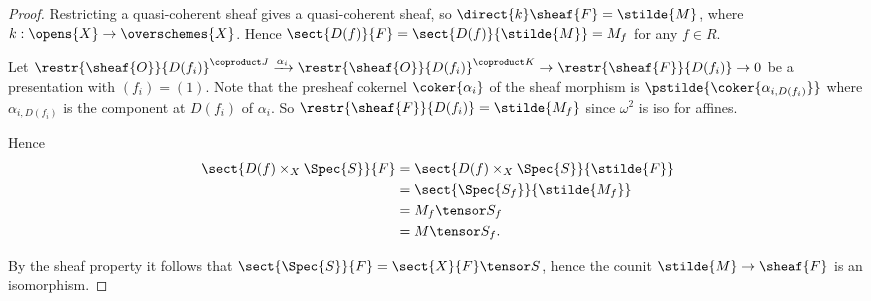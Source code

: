 \begin{proof}
Restricting a quasi-coherent sheaf gives a quasi-coherent sheaf,
so $\direct{k}\sheaf{F} = \stilde{M}$,
where $k:\opens{X} \rightarrow \overschemes{X}$.
Hence $\sect{D(f)}{F} = \sect{D(f)}{\stilde{M}} = M_f$ 
for any $f\in R$.

Let 
$\restr{\sheaf{O}}{D(f_i)}^{\coproduct J} \xrightarrow{\alpha_i} \restr{\sheaf{O}}{D(f_i)}^{\coproduct K} \rightarrow \restr{\sheaf{F}}{D(f_i)} \rightarrow 0$ be a presentation with $(f_i) = (1)$.
Note that the presheaf cokernel $\coker{\alpha_i}$ of the sheaf morphism is
$\pstilde{\coker{\alpha_{i,D(f_i)}}}$ where $\alpha_{i,D(f_i)}$ is the component at $D(f_i)$ of $\alpha_i$.
So $\restr{\sheaf{F}}{D(f_i)} = \stilde{M_f}$ since $\omega^2$ is iso for affines.

Hence 
\begin{align*}
\sect{D(f) \times_X \Spec{S}}{F} &= \sect{D(f) \times_X \Spec{S}}{\stilde{F}}\\
&= \sect{\Spec{S_f}}{\stilde{M_f}} \\ 
&= M_f \tensor S_f\\
& = M \tensor S_f.
\end{align*}

By the sheaf property it follows that $\sect{\Spec{S}}{F} = \sect{X}{F} \tensor S$,
hence the counit $\stilde{M} \rightarrow \sheaf{F}$ is an isomorphism.
\end{proof}
